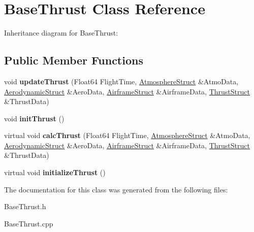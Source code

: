 \hypertarget{class_base_thrust}{}\section{Base\+Thrust Class Reference}
\label{class_base_thrust}


Inheritance diagram for Base\+Thrust\+:
\subsection*{Public Member Functions}
\begin{DoxyCompactItemize}
\item 
\mbox{\label{class_base_thrust_a869359a1b2b7cddcbe5979d6a1cf5eac}} 
void {\bfseries update\+Thrust} (Float64 Flight\+Time, \hyperlink{group___data_cloud_struct_atmosphere_struct}{Atmosphere\+Struct} \&Atmo\+Data, \hyperlink{group___data_cloud_struct_aerodynamic_struct}{Aerodynamic\+Struct} \&Aero\+Data, \hyperlink{group___data_cloud_struct_airframe_struct}{Airframe\+Struct} \&Airframe\+Data, \hyperlink{group___data_cloud_struct_thrust_struct}{Thrust\+Struct} \&Thrust\+Data)
\item 
\mbox{\label{class_base_thrust_a1a9a88e6c05cc0b2564522347365900c}} 
void {\bfseries init\+Thrust} ()
\item 
\mbox{\label{class_base_thrust_ac578e683598739655ce52ea85d97362b}} 
virtual void {\bfseries calc\+Thrust} (Float64 Flight\+Time, \hyperlink{group___data_cloud_struct_atmosphere_struct}{Atmosphere\+Struct} \&Atmo\+Data, \hyperlink{group___data_cloud_struct_aerodynamic_struct}{Aerodynamic\+Struct} \&Aero\+Data, \hyperlink{group___data_cloud_struct_airframe_struct}{Airframe\+Struct} \&Airframe\+Data, \hyperlink{group___data_cloud_struct_thrust_struct}{Thrust\+Struct} \&Thrust\+Data)
\item 
\mbox{\label{class_base_thrust_a373a66f6415f783f0e70782763ae45c7}} 
virtual void {\bfseries initialize\+Thrust} ()
\end{DoxyCompactItemize}


The documentation for this class was generated from the following files\+:\begin{DoxyCompactItemize}
\item 
Base\+Thrust.\+h\item 
Base\+Thrust.\+cpp\end{DoxyCompactItemize}
